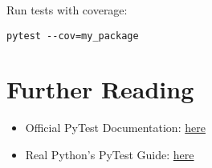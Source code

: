 Run tests with coverage:

\begin{verbatim}
pytest --cov=my_package
\end{verbatim}

\section{Further Reading}
\begin{itemize}
    \item Official PyTest Documentation: \href{https://docs.pytest.org/}{here}
    \item Real Python's PyTest Guide: \href{https://realpython.com/pytest-python-testing/}{here}
\end{itemize}

\nocite{Abadi:2016}

   \printbibliography[heading=subbibliography, segment=\therefsegment]










